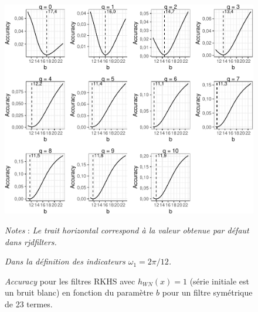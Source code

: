 \documentclass[
  11pt,
  french,
  a4paper]{article}
\newcommand\1{\mathds{1}}
\begin{document}
\begin{figure}[H]

{\centering \includegraphics{img/bookdown/pdf/rkhsoptiaccuracy11wn-1} 

}

\caption[\emph{Accuracy} pour les filtres RKHS avec \(h_{WN}(x)=1\) (série initiale est un bruit blanc) en fonction du paramètre \(b\) pour un filtre symétrique de 23 termes]{\emph{Accuracy} pour les filtres RKHS avec \(h_{WN}(x)=1\) (série initiale est un bruit blanc) en fonction du paramètre \(b\) pour un filtre symétrique de 23 termes.}\label{fig:rkhsoptiaccuracy11wn}

\footnotesize


\emph{Notes} : \emph{Le trait horizontal correspond à la valeur obtenue par défaut dans rjdfilters.}

\emph{Dans la définition des indicateurs \(\omega_1=2\pi/12\).}
\normalsize\end{figure}
\end{document}
